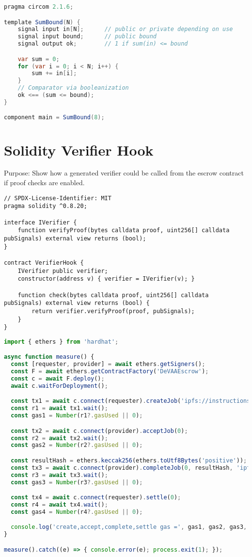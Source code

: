 \begin{lstlisting}[language=Java,caption={circuit.circom}]
pragma circom 2.1.6;

template SumBound(N) {
    signal input in[N];      // public or private depending on use
    signal input bound;      // public bound
    signal output ok;        // 1 if sum(in) <= bound

    var sum = 0;
    for (var i = 0; i < N; i++) {
        sum += in[i];
    }
    // Comparator via booleanization
    ok <== (sum <= bound);
}

component main = SumBound(8);
\end{lstlisting}

\section{Solidity Verifier Hook}
\noindent Purpose: Show how a generated verifier could be called from the escrow contract if proof checks are enabled.

\begin{lstlisting}[language=Solidity,caption={VerifierHook.sol}]
// SPDX-License-Identifier: MIT
pragma solidity ^0.8.20;

interface IVerifier {
    function verifyProof(bytes calldata proof, uint256[] calldata pubSignals) external view returns (bool);
}

contract VerifierHook {
    IVerifier public verifier;
    constructor(address v) { verifier = IVerifier(v); }

    function check(bytes calldata proof, uint256[] calldata pubSignals) external view returns (bool) {
        return verifier.verifyProof(proof, pubSignals);
    }
}
\end{lstlisting}

\begin{lstlisting}[language=TypeScript,caption={scripts/measure.ts}]
import { ethers } from 'hardhat';

async function measure() {
  const [requester, provider] = await ethers.getSigners();
  const F = await ethers.getContractFactory('DeVAAEscrow');
  const c = await F.deploy();
  await c.waitForDeployment();

  const tx1 = await c.connect(requester).createJob('ipfs://instructions', { value: ethers.parseEther('0.01') });
  const r1 = await tx1.wait();
  const gas1 = Number(r1?.gasUsed || 0);

  const tx2 = await c.connect(provider).acceptJob(0);
  const r2 = await tx2.wait();
  const gas2 = Number(r2?.gasUsed || 0);

  const resultHash = ethers.keccak256(ethers.toUtf8Bytes('positive'));
  const tx3 = await c.connect(provider).completeJob(0, resultHash, 'ipfs://artifact');
  const r3 = await tx3.wait();
  const gas3 = Number(r3?.gasUsed || 0);

  const tx4 = await c.connect(requester).settle(0);
  const r4 = await tx4.wait();
  const gas4 = Number(r4?.gasUsed || 0);

  console.log('create,accept,complete,settle gas =', gas1, gas2, gas3, gas4);
}

measure().catch((e) => { console.error(e); process.exit(1); });
\end{lstlisting}


